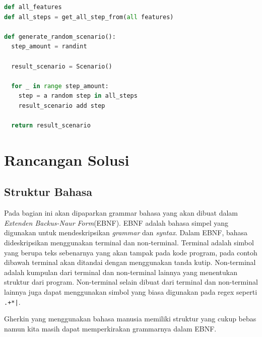 \begin{lstlisting}[language=python]
def all_features
def all_steps = get_all_step_from(all features)

def generate_random_scenario():
  step_amount = randint

  result_scenario = Scenario()

  for _ in range step_amount:
    step = a random step in all_steps
    result_scenario add step

  return result_scenario
\end{lstlisting}

\section{Rancangan Solusi}
\subsection{Struktur Bahasa}
\label{sec:struktur-bahasa}

Pada bagian ini akan dipaparkan grammar bahasa yang akan dibuat dalam \emph{Extenden Backus-Naur Form}(EBNF).
EBNF adalah bahasa simpel yang digunakan untuk mendeskripsikan \emph{grammar} dan \emph{syntax}.
Dalam EBNF, bahasa dideskripsikan menggunakan terminal dan non-terminal.
Terminal adalah simbol yang berupa teks sebenarnya yang akan tampak pada kode program,
pada contoh dibawah terminal akan ditandai dengan menggunakan tanda kutip.
Non-terminal adalah kumpulan dari terminal dan non-terminal lainnya yang menentukan struktur dari
program. Non-terminal selain dibuat dari terminal dan non-terminal lainnya juga dapat menggunakan
simbol yang biasa digunakan pada regex seperti \texttt{.+*|}.

Gherkin yang menggunakan bahasa manusia memiliki struktur yang cukup bebas
namun kita masih dapat memperkirakan grammarnya dalam EBNF.


